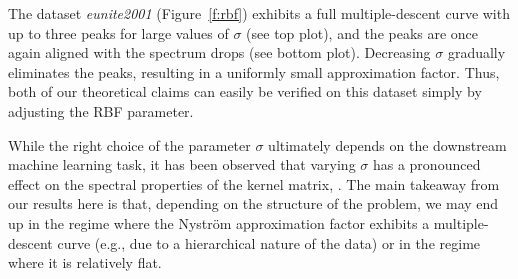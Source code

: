 \documentclass{article}
\begin{document}
The dataset \emph{eunite2001} (Figure~\ref{f:rbf}) exhibits a full
multiple-descent curve with up to three peaks for large values of
$\sigma$ (see top plot), and the peaks are once again aligned with the spectrum
drops (see bottom plot). Decreasing $\sigma$ gradually eliminates the peaks, 
resulting in a uniformly small approximation factor. Thus, both of our theoretical
claims can easily be verified on this dataset simply by adjusting the RBF parameter.

While the right choice of the parameter $\sigma$ ultimately depends on
the downstream machine learning task, it has been observed that
varying $\sigma$ has a pronounced effect on the spectral properties of
the kernel matrix, \citep[see,
e.g.,][]{revisiting-nystrom}.  
The main takeaway from our results here is that, depending on the
structure of the problem, we may end up in the regime where the
Nystr\"om approximation factor exhibits a multiple-descent curve
(e.g., due to a hierarchical nature of the data) or in the regime
where it is relatively flat.  




\end{document}
